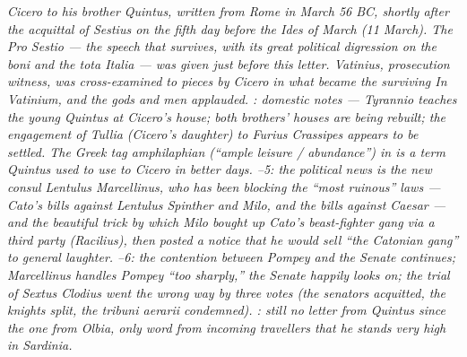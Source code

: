 
\textit{Cicero to his brother Quintus, written from Rome in
March 56 BC, shortly after the acquittal of Sestius on the
fifth day before the Ides of March (11 March). The Pro
Sestio --- the speech that survives, with its great political
digression on the \textit{boni} and the \textit{tota Italia}
--- was given just before this letter. Vatinius, prosecution
witness, was cross-examined to pieces by Cicero in what
became the surviving \textit{In Vatinium}, and the gods and
men applauded. : domestic notes --- Tyrannio
teaches the young Quintus at Cicero's house; both brothers'
houses are being rebuilt; the engagement of Tullia (Cicero's
daughter) to Furius Crassipes appears to be settled. The
Greek tag \textit{amphilaphian} (``ample leisure / abundance'')
in  is a term Quintus used to use to Cicero in
better days. --5: the political news is the
new consul Lentulus Marcellinus, who has been blocking the
``most ruinous'' laws --- Cato's bills against Lentulus
Spinther and Milo, and the bills against Caesar --- and the
beautiful trick by which Milo bought up Cato's beast-fighter
gang via a third party (Racilius), then posted a notice that
he would sell ``the Catonian gang'' to general laughter.
--6: the contention between Pompey and the
Senate continues; Marcellinus handles Pompey ``too sharply,''
the Senate happily looks on; the trial of Sextus Clodius
went the wrong way by three votes (the senators acquitted,
the knights split, the \textit{tribuni aerarii} condemned).
: still no letter from Quintus since the one
from Olbia, only word from incoming travellers that he
stands very high in Sardinia.}

